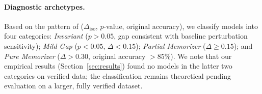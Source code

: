 \paragraph{Diagnostic archetypes.}
Based on the pattern of ($\Delta_{\mathrm{iso}}$, $p$-value,
original accuracy), we classify models into four categories:
\emph{Invariant} ($p > 0.05$, gap consistent with baseline
perturbation sensitivity);
\emph{Mild Gap} ($p < 0.05$, $\Delta < 0.15$);
\emph{Partial Memorizer} ($\Delta \geq 0.15$);
and \emph{Pure Memorizer} ($\Delta > 0.30$, original accuracy $> 85\%$).
We note that our empirical results (Section~\ref{sec:results}) found
no models in the latter two categories on verified data; the
classification remains theoretical pending evaluation on a larger,
fully verified dataset.
